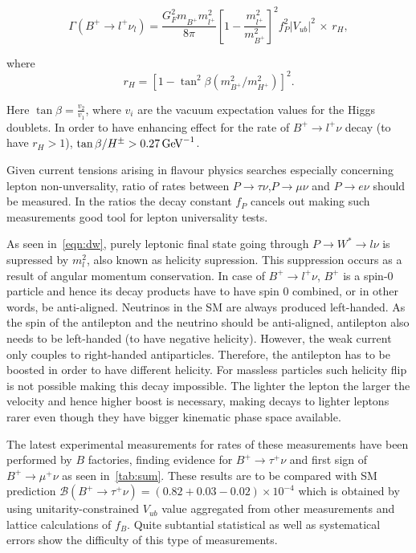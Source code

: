 \begin{equation}
\Gamma(B^{+} \rightarrow {l^{+}} \nu_{l})=  
        \frac{G_{F}^{2} m^{}_{B^{+}}  m_{l^{+}}^{2}}{8\pi} 
        \left[1 - \frac{m_{l^{+}}^{2}}{m_{B^{+}}^{2}}\right]^{2}  
	f_{P}^{2} |V_{ub}|^{2} \,\times\, r_H,
\end{equation}

where
\begin{equation}
	r_H=[1-\tan^2\beta(m^{2}_{B^{+}}/m^{2}_{H^{+}})]^2.
\end{equation}

Here $\tan\beta = \frac{v_{2}}{v_{1}}$, where $v_{i}$ are the vacuum expectation values for the Higgs doublets. In order to have enhancing effect for the rate of $B^{+}\rightarrow l^{+}\nu$ decay (to have $r_{H}>1$), $\tan\beta/H^{\pm}> 0.27 \mathrm{\,Ge\kern -0.1em V}^{-1}$.

Given current tensions arising in flavour physics searches especially concerning lepton non-unversality, ratio of rates between $P\rightarrow\tau\nu$,$P\rightarrow\mu\nu$ and $P\rightarrow e\nu$ should be measured. In the ratios the decay constant $f_{P}$ cancels out making such measurements good tool for lepton universality tests.

As seen in~\autoref{eqn:dw}, purely leptonic final state going through $P\rightarrow W^{*}\rightarrow l \nu$ is supressed by $m^{2}_{l}$, also known as helicity supression. This suppression occurs as a result of angular momentum conservation. In case of $B^{+}\rightarrow l^{+} \nu$, $B^{+}$ is a spin-0 particle and hence its decay products have to have spin 0 combined, or in other words, be anti-aligned. Neutrinos in the SM are always produced left-handed. As the spin of the antilepton and the neutrino should be anti-aligned, antilepton also needs to be left-handed (to have negative helicity). However, the weak current only couples to right-handed antiparticles. Therefore, the antilepton has to be boosted in order to have different helicity. For massless particles such helicity flip is not possible making this decay impossible. The lighter the lepton the larger the velocity and hence higher boost is necessary, making decays to lighter leptons rarer even though they have bigger kinematic phase space available.

The latest experimental measurements for rates of these measurements have been performed by $B$ factories, finding evidence for $B^{+}\rightarrow \tau^{+}\nu$ and first sign of $B^{+}\rightarrow \mu^{+}\nu$ as seen in~\autoref{tab:sum}. These results are to be compared with SM prediction $\mathcal{B}(B^{+}\rightarrow \tau^{+}\nu) = (0.82+0.03-0.02)\times10^{-4}$\cite{Charles:2004jd} which is obtained by using unitarity-constrained $V_{ub}$ value aggregated from other measurements and lattice calculations of $f_{B}$. Quite subtantial statistical as well as systematical errors show the difficulty of this type of measurements. 

